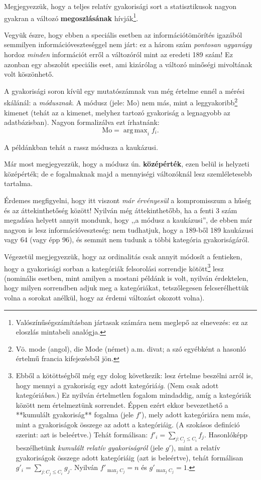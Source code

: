 \documentclass[
]{book}
\let\rmarkdownfootnote\footnote%
\def\footnote{\protect\rmarkdownfootnote}
\begin{document}
Megjegyezzük, hogy a teljes relatív gyakorisági sort a statisztikusok nagyon gyakran a változó \textbf{megoszlásának} hívják\footnote{Valószínűségszámításban jártasak számára nem meglepő az elnevezés: ez az eloszlás mintabeli analógja.}.

Vegyük észre, hogy ebben a speciális esetben az információtömörítés igazából semmilyen információveszteséggel nem járt: ez a három szám \emph{pontosan ugyanúgy} hordoz \emph{minden} információt erről a változóról mint az eredeti 189 szám! Ez azonban egy abszolút speciális eset, ami kizárólag a változó minőségi mivoltának volt köszönhető.

A gyakorisági soron kívül egy mutatószámnak van még értelme ennél a mérési skálánál: a \emph{módusznak}. A módusz (jele: \(\mathrm{Mo}\)) nem más, mint a leggyakoribb\footnote{Vö. mode (angol), die Mode (német) a.m. divat; a szó egyébként a hasonló értelmű francia kifejezésből jön.} kimenet (tehát az a kimenet, melyhez tartozó gyakoriság a legnagyobb az adatbázisban). Nagyon formalizálva ezt írhatnánk:
\[
    \mathrm{Mo}=\mathop{\mathrm{arg\,max}}_i f_i.
\]

A példánkban tehát a rassz módusza a kaukázusi.

Már most megjegyezzük, hogy a módusz ún. \textbf{középérték}, ezen belül is helyzeti középérték; de e fogalmaknak majd a mennyiségi változóknál lesz szemléletesebb tartalma.

Érdemes megfigyelni, hogy itt viszont \emph{már érvényesül} a kompromisszum a hűség és az áttekinthetőség között! Nyilván még áttekinthetőbb, ha a fenti 3 szám megadása helyett annyit mondunk, hogy ,,a módusz a kaukázusi'', de ebben már nagyon is lesz információveszteség: nem tudhatjuk, hogy a 189-ből 189 kaukázusi vagy 64 (vagy épp 96), és semmit nem tudunk a többi kategória gyakoriságáról.

Végezetül megjegyezzük, hogy az ordinalitás csak annyit módosít a fentieken, hogy a gyakorisági sorban a kategóriák felsorolási sorrendje kötött\footnote{Ebből a kötöttségből még egy dolog következik: lesz értelme beszélni arról is, hogy mennyi a gyakoriság egy adott kategóriá\emph{ig}. (Nem csak adott kategóriá\emph{ban}.) Ez nyilván értelmetlen fogalom mindaddig, amíg a kategóriák között nem értelmeztünk sorrendet. Éppen ezért ekkor bevezethető a **kumulált gyakoriság** fogalma (jele $f'$), mely adott kategóriára nem más, mint a gyakoriságok összege az adott a kategóriáig. (A szokásos definíció szerint: azt is beleértve.) Tehát formálisan: $f'_i=\sum_{j:C_j\leq C_i} f_j$. Hasonlóképp beszélhetünk \emph{kumulált relatív gyakoriságról} (jele $g'$), mint a relatív gyakoriságok összege adott kategóriáig (azt is beleértve), tehát formálisan $g'_i=\sum_{j:C_j\leq C_i} g_j$. Nyilván $f'_{\max_j C_j}=n$ és $g'_{\max_j C_j}=1$.} lesz (nominális esetben, mint amilyen a mostani példánk is volt, nyilván érdektelen, hogy milyen sorrendben adjuk meg a kategóriákat, tetszőlegesen felcserélhettük volna a sorokat anélkül, hogy az érdemi változást okozott volna).
\end{document}
